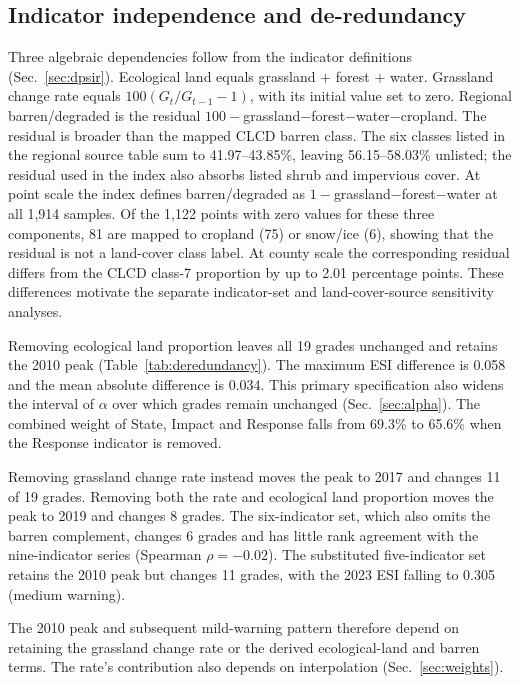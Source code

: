 \documentclass[preprint,11pt,authoryear]{elsarticle}
\begin{document}
\subsection{Indicator independence and de-redundancy}
\label{sec:deredundancy}
Three algebraic dependencies follow from the indicator definitions (Sec.~\ref{sec:dpsir}). Ecological land equals grassland $+$ forest $+$ water. Grassland change rate equals $100(G_t/G_{t-1}-1)$, with its initial value set to zero. Regional barren/degraded is the residual $100-$grassland$-$forest$-$water$-$cropland. The residual is broader than the mapped CLCD barren class. The six classes listed in the regional source table sum to 41.97--43.85\%, leaving 56.15--58.03\% unlisted; the residual used in the index also absorbs listed shrub and impervious cover. At point scale the index defines barren/degraded as $1-$grassland$-$forest$-$water at all 1,914 samples. Of the 1,122 points with zero values for these three components, 81 are mapped to cropland (75) or snow/ice (6), showing that the residual is not a land-cover class label. At county scale the corresponding residual differs from the CLCD class-7 proportion by up to 2.01 percentage points. These differences motivate the separate indicator-set and land-cover-source sensitivity analyses.

Removing ecological land proportion leaves all 19 grades unchanged and retains the 2010 peak (Table~\ref{tab:deredundancy}). The maximum ESI difference is 0.058 and the mean absolute difference is 0.034. This primary specification also widens the interval of $\alpha$ over which grades remain unchanged (Sec.~\ref{sec:alpha}). The combined weight of State, Impact and Response falls from 69.3\% to 65.6\% when the Response indicator is removed.

Removing grassland change rate instead moves the peak to 2017 and changes 11 of 19 grades. Removing both the rate and ecological land proportion moves the peak to 2019 and changes 8 grades. The six-indicator set, which also omits the barren complement, changes 6 grades and has little rank agreement with the nine-indicator series (Spearman $\rho=-0.02$). The substituted five-indicator set retains the 2010 peak but changes 11 grades, with the 2023 ESI falling to 0.305 (medium warning).

The 2010 peak and subsequent mild-warning pattern therefore depend on retaining the grassland change rate or the derived ecological-land and barren terms. The rate's contribution also depends on interpolation (Sec.~\ref{sec:weights}).
\end{document}
